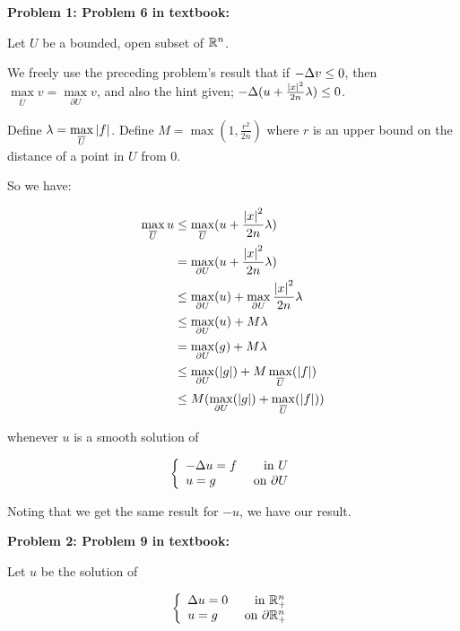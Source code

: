 \documentclass[a4paper,12pt]{article}
\begin{document}
{\bf Problem 1: Problem 6 in textbook:}

Let $U$ be a bounded, open subset of $\mathbb{R}^n$.

We freely use the preceding problem's result that if $-\Delta v \leq 0$, then $\max\limits_{\overline{U}} v = \max\limits_{\partial U} v$, and also the hint given; $-\Delta(u + \frac{\left\lvert x \right\rvert^2}{2n} \lambda) \leq 0$. %

Define $\lambda = \max\limits_{\overline{U}} \left\lvert f \right\rvert$. Define $M = \max(1,\frac{r^2}{2n})$ where $r$ is an upper bound on the distance of a point in $U$ from $0$.

So we have:

\begin{align*}
\max\limits_{\overline{U}} u &\leq \max\limits_{\overline{U}} (u + \frac{\left\lvert x \right\rvert^2}{2n} \lambda) \\
&= \max\limits_{\partial U} (u + \frac{\left\lvert x \right\rvert^2}{2n} \lambda)\\
&\leq \max\limits_{\partial U} (u) +\max\limits_{\partial U} \frac{\left\lvert x \right\rvert^2}{2n} \lambda\\
&\leq \max\limits_{\partial U} (u) +M \lambda\\
&= \max\limits_{\partial U} (g) +M \lambda\\
&\leq \max\limits_{\partial U} (\left\lvert g \right\rvert) + M \max\limits_{\overline{U}} (\left\lvert f \right\rvert)\\
&\leq M(\max\limits_{\partial U} (\left\lvert g \right\rvert) + \max\limits_{\overline{U}} (\left\lvert f \right\rvert))\\
\end{align*} 

whenever $u$ is a smooth solution of

\begin{displaymath}
   \left\{
     \begin{array}{lr}
       -\Delta u = f & \text{ in } U\\
       u=g & \text{ on }\partial U
     \end{array}
   \right.
\end{displaymath}

Noting that we get the same result for $-u$, we have our result.

\shunt

{\bf Problem 2: Problem 9 in textbook:}

Let $u$ be the solution of 

\begin{displaymath}
   \left\{
     \begin{array}{lr}
       \Delta u = 0 & \text{ in } \mathbb{R}_+^n\\
       u=g & \text{ on }\partial \mathbb{R}_+^n
     \end{array}
   \right.
\end{displaymath}
\end{document}
